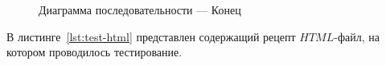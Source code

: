 \begin{figure}[!ht]
	\caption{Диаграмма последовательности --- Конец}
	\label{img:sequence-diagram-pt-2}
\end{figure}

\clearpage


В листинге~\ref{lst:test-html} представлен содержащий рецепт $HTML$-файл, на котором проводилось тестирование.

